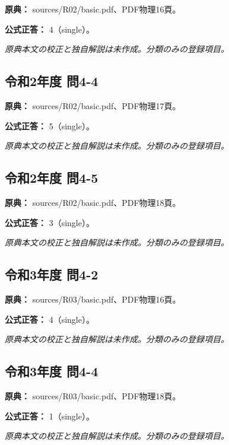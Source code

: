\noindent\textbf{原典：} sources/R02/basic.pdf、PDF物理16頁。

\textbf{公式正答：} 4（single）。

\par\textit{原典本文の校正と独自解説は未作成。分類のみの登録項目。}

\subsection{令和2年度 問4-4}
\label{q:r02-reg-basic-4-4}

\noindent\textbf{原典：} sources/R02/basic.pdf、PDF物理17頁。

\textbf{公式正答：} 5（single）。

\par\textit{原典本文の校正と独自解説は未作成。分類のみの登録項目。}

\subsection{令和2年度 問4-5}
\label{q:r02-reg-basic-4-5}

\noindent\textbf{原典：} sources/R02/basic.pdf、PDF物理18頁。

\textbf{公式正答：} 3（single）。

\par\textit{原典本文の校正と独自解説は未作成。分類のみの登録項目。}

\subsection{令和3年度 問4-2}
\label{q:r03-reg-basic-4-2}

\noindent\textbf{原典：} sources/R03/basic.pdf、PDF物理16頁。

\textbf{公式正答：} 4（single）。

\par\textit{原典本文の校正と独自解説は未作成。分類のみの登録項目。}

\subsection{令和3年度 問4-4}
\label{q:r03-reg-basic-4-4}

\noindent\textbf{原典：} sources/R03/basic.pdf、PDF物理18頁。

\textbf{公式正答：} 1（single）。

\par\textit{原典本文の校正と独自解説は未作成。分類のみの登録項目。}


